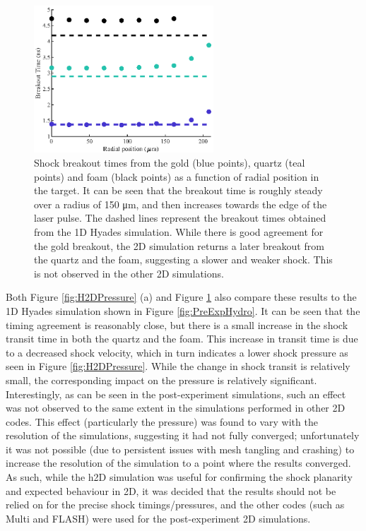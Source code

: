 \begin{figure}[hbt!]
\centering
\includegraphics[width=0.6\textwidth]{figures/Experiment/H2DTiming.eps}%
\caption{\label{fig:H2DTiming} Shock breakout times from the gold (blue points), quartz (teal points) and foam (black points) as a function of radial position in the target. It can be seen that the breakout time is roughly steady over a radius of 150 \unit{\micro\meter}, and then increases towards the edge of the laser pulse. The dashed lines represent the breakout times obtained from the 1D Hyades simulation. While there is good agreement for the gold breakout, the 2D simulation returns a later breakout from the quartz and the foam, suggesting a slower and weaker shock. This is not observed in the other 2D simulations.  }
\end{figure}

Both Figure \ref{fig:H2DPressure} (a) and Figure \ref{fig:H2DTiming} also compare these results to the 1D Hyades simulation shown in Figure \ref{fig:PreExpHydro}. It can be seen that the timing agreement is reasonably close, but there is a small increase in the shock transit time in both the quartz and the foam. This increase in transit time is due to a decreased shock velocity, which in turn indicates a lower shock pressure as seen in Figure \ref{fig:H2DPressure}. While the change in shock transit is relatively small, the corresponding impact on the pressure is relatively significant. Interestingly, as can be seen in the post-experiment simulations, such an effect was not observed to the same extent in the simulations performed in other 2D codes. This effect (particularly the pressure) was found to vary with the resolution of the simulations, suggesting it had not fully converged; unfortunately it was not possible (due to persistent issues with mesh tangling and crashing) to increase the resolution of the simulation to a point where the results converged. As such, while the h2D simulation was useful for confirming the shock planarity and expected behaviour in 2D, it was decided that the results should not be relied on for the precise shock timings/pressures, and the other codes (such as Multi and FLASH) were used for the post-experiment 2D simulations.


